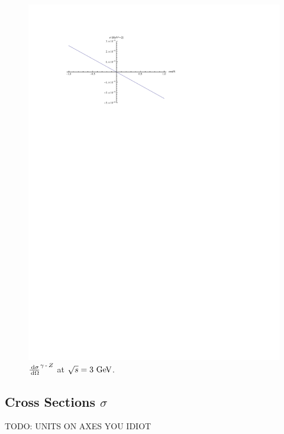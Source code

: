\documentclass[]{article}
\begin{document}
\begin{figure}[H]
	\vspace{10pt}
	\centering
	\includegraphics[scale=1.4]{diff_gamma_z}
	\caption{$\frac{\,\operatorname{d}\!{\sigma}}{\,\operatorname{d}\!{\Omega}}^{\gamma\operatorname{-}Z }$ at $\sqrt{s}=3\GeV$.}
	\label{fig:diffgammaz}
\end{figure}


\subsection{Cross Sections $\sigma$}

TODO: UNITS ON AXES YOU IDIOT
\end{document}
